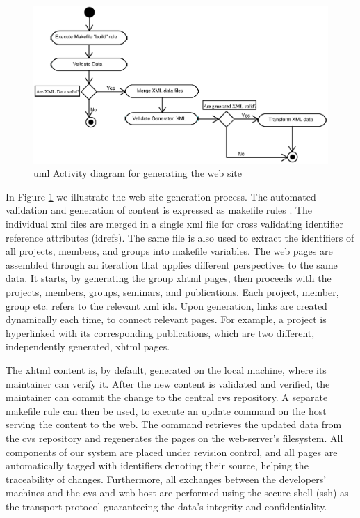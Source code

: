 \documentclass{article}
\begin{document}
\begin{figure}[h!]
\includegraphics[scale=0.6]{generate-web-site}
\caption{{\sc uml} Activity diagram for generating the web site}
\label{fig:generate-web-site}
\end{figure}

In Figure \ref{fig:generate-web-site} we illustrate the web site generation process.
The automated validation and generation of content is
expressed as makefile rules \cite{OTT91}.
The individual {\sc xml} files are merged in a
single {\sc xml} file for cross validating identifier
reference attributes ({\sc idref}s).
The same file is also used to extract the identifiers of
all projects, members, and groups into makefile
variables.
The web pages are assembled through an iteration that applies different perspectives
to the same data.
It starts, by generating the group {\sc xhtml} pages, then proceeds with the projects, members, groups, seminars, and publications.
Each project, member, group etc. refers to the relevant {\sc xml id}s.
Upon generation, links are created dynamically each time, to
connect relevant pages.
For example, a project is hyperlinked with its corresponding publications,
which are two different, independently generated, {\sc xhtml} pages.

The {\sc xhtml} content is, by default, generated on the
local machine, where its maintainer can verify it.
After the new content is validated and verified,
the maintainer can commit the change to the central {\sc cvs} repository. 
A separate makefile rule can then be used,
to execute an update command on the
host serving the content to the web.
The command retrieves the updated data from the {\sc cvs}
repository and regenerates the pages on the web-server's
filesystem.
All components of our system are placed under revision control, and
all pages are automatically tagged with identifiers
denoting their source, helping the traceability of changes.
Furthermore, all exchanges between the developers' machines and the
{\sc cvs} and web host are performed using the secure
shell ({\sc ssh}) as the transport protocol guaranteeing the data's integrity
and confidentiality.
\end{document}
